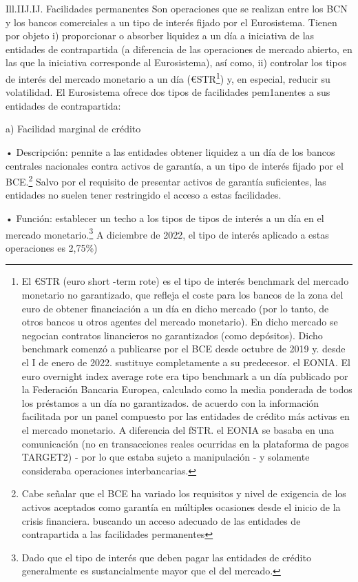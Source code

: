 \documentclass[10pt,a4paper]{article}
\begin{document}
{Ill.IIJ.IJ. Facilidades permanentes
Son operaciones que se realizan entre los BCN y los bancos comerciales a un tipo de interés fijado por el Eurosistema. Tienen por objeto i) proporcionar o absorber liquidez a un día a iniciativa de las entidades de contrapartida (a diferencia de las operaciones de mercado abierto, en las que la iniciativa corresponde al Eurosistema), así como, ii) controlar los tipos de interés del mercado monetario a un día (€STR\footnote{%
    El €STR (euro short -term rote) es el tipo de interés benchmark del mercado monetario no garantizado, que refleja el coste para los bancos de la zona del euro de obtener financiación a un día en dicho mercado (por lo tanto, de otros bancos u otros agentes del mercado monetario). En dicho mercado se negocian contratos linancieros no garantizados (como depósitos). Dicho benchmark comenzó a publicarse por el BCE desde octubre de 2019 y. desde el I de enero de 2022. sustituye completamente a su predecesor. el EONIA. El euro overnight index average rote era tipo benchmark a un día publicado por la Federación Bancaria Europea, calculado como la media ponderada de todos los préstamos a un día no garantizados. de acuerdo con la información facilitada por un panel compuesto por las entidades de crédito más activas en el mercado monetario. A diferencia del fSTR. el EONIA se basaba en una comunicación (no en transacciones reales ocurridas en la plataforma de pagos TARGET2) - por lo que estaba sujeto a manipulación - y solamente consideraba operaciones interbancarias.
}) y, en especial, reducir su volatilidad. El Eurosistema ofrece dos tipos de facilidades pem1anentes a sus entidades de contrapartida:

a) Facilidad marginal de crédito

• Descripción: pennite a las entidades obtener liquidez a un día de los bancos centrales nacionales contra activos de garantía, a un tipo de interés fijado por el BCE.\footnote{%
    Cabe señalar que el BCE ha variado los requisitos y nivel de exigencia de los activos aceptados como garantía en múltiples ocasiones desde el inicio de la crisis financiera. buscando un acceso adecuado de las entidades de contrapartida a las facilidades permanentes
} Salvo por el requisito de presentar activos de garantía suficientes, las entidades no suelen tener restringido el acceso a estas facilidades.

• Función: establecer un techo a los tipos de tipos de interés a un día en el mercado monetario.\footnote{%
    Dado que el tipo de interés que deben pagar las entidades de crédito generalmente es sustancialmente mayor que el del mercado.
} A diciembre de 2022, el tipo de interés aplicado a estas operaciones es 2,75\%) 

}
\end{document}
